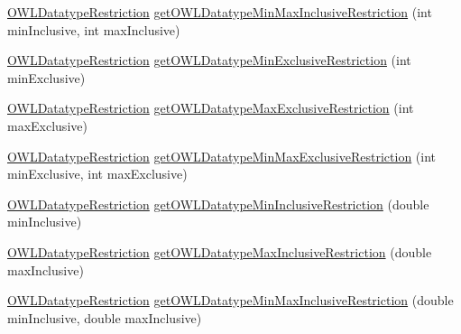 \begin{DoxyCompactItemize}
\item 
\hyperlink{interfaceorg_1_1semanticweb_1_1owlapi_1_1model_1_1_o_w_l_datatype_restriction}{O\-W\-L\-Datatype\-Restriction} \hyperlink{interfaceorg_1_1semanticweb_1_1owlapi_1_1model_1_1_o_w_l_data_factory_a8a1886d5c137b3e4cd156ae8672b899f}{get\-O\-W\-L\-Datatype\-Min\-Max\-Inclusive\-Restriction} (int min\-Inclusive, int max\-Inclusive)
\item 
\hyperlink{interfaceorg_1_1semanticweb_1_1owlapi_1_1model_1_1_o_w_l_datatype_restriction}{O\-W\-L\-Datatype\-Restriction} \hyperlink{interfaceorg_1_1semanticweb_1_1owlapi_1_1model_1_1_o_w_l_data_factory_aba8311afb8fe91529201a8980706c548}{get\-O\-W\-L\-Datatype\-Min\-Exclusive\-Restriction} (int min\-Exclusive)
\item 
\hyperlink{interfaceorg_1_1semanticweb_1_1owlapi_1_1model_1_1_o_w_l_datatype_restriction}{O\-W\-L\-Datatype\-Restriction} \hyperlink{interfaceorg_1_1semanticweb_1_1owlapi_1_1model_1_1_o_w_l_data_factory_a8cd4909a07803c8c8f8ddb07732555fe}{get\-O\-W\-L\-Datatype\-Max\-Exclusive\-Restriction} (int max\-Exclusive)
\item 
\hyperlink{interfaceorg_1_1semanticweb_1_1owlapi_1_1model_1_1_o_w_l_datatype_restriction}{O\-W\-L\-Datatype\-Restriction} \hyperlink{interfaceorg_1_1semanticweb_1_1owlapi_1_1model_1_1_o_w_l_data_factory_a52726256b4997ec6bfd98ffcc95fa99a}{get\-O\-W\-L\-Datatype\-Min\-Max\-Exclusive\-Restriction} (int min\-Exclusive, int max\-Exclusive)
\item 
\hyperlink{interfaceorg_1_1semanticweb_1_1owlapi_1_1model_1_1_o_w_l_datatype_restriction}{O\-W\-L\-Datatype\-Restriction} \hyperlink{interfaceorg_1_1semanticweb_1_1owlapi_1_1model_1_1_o_w_l_data_factory_a32394940e9fa0387cc25fedf5df2b34e}{get\-O\-W\-L\-Datatype\-Min\-Inclusive\-Restriction} (double min\-Inclusive)
\item 
\hyperlink{interfaceorg_1_1semanticweb_1_1owlapi_1_1model_1_1_o_w_l_datatype_restriction}{O\-W\-L\-Datatype\-Restriction} \hyperlink{interfaceorg_1_1semanticweb_1_1owlapi_1_1model_1_1_o_w_l_data_factory_a71eaaef27cb0d5106a83464a66d3ba99}{get\-O\-W\-L\-Datatype\-Max\-Inclusive\-Restriction} (double max\-Inclusive)
\item 
\hyperlink{interfaceorg_1_1semanticweb_1_1owlapi_1_1model_1_1_o_w_l_datatype_restriction}{O\-W\-L\-Datatype\-Restriction} \hyperlink{interfaceorg_1_1semanticweb_1_1owlapi_1_1model_1_1_o_w_l_data_factory_a0be0e464c6d50ef3d4edf7ba325474c0}{get\-O\-W\-L\-Datatype\-Min\-Max\-Inclusive\-Restriction} (double min\-Inclusive, double max\-Inclusive)

\end{DoxyCompactItemize}
